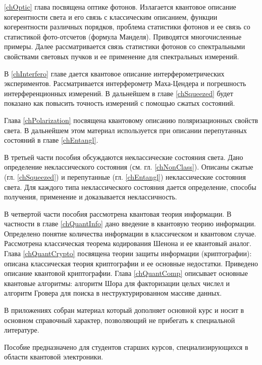 \ref{chOptic} глава посвящена оптике фотонов. Излагается квантовое описание
когерентности света и его связь с классическим описанием, функции
когерентности различных порядков, проблема статистики фотонов и ее
связь со статистикой фото-отсчетов (формула Манделя). Приводятся
многочисленные примеры. Далее рассматривается связь статистики фотонов
со спектральными свойствами световых пучков и ее применение для
спектральных измерений.

В \ref{chInterfero} главе дается квантовое описание интерферометрических
экспериментов. Рассматривается интерферометр Маха-Цендера и
погрешность интерференционных измерений. В дальнейшем в главе
\ref{chSqueezed} будет показано как повысить точность измерений с
помощью сжатых состояний.

Глава \ref{chPolarization} посвящена квантовому описанию
поляризационных свойств света. В дальнейшем этом материал используется
при описании перепутанных состояний в главе \ref{chEntangl}.

В третьей части пособия обсуждаются неклассические
состояния света. Дано определение неклассического состояния
(см. гл. \ref{chNonClass}). Описаны 
сжатые (гл. \ref{chSqueezed}) и перепутанные (гл. \ref{chEntangl})
неклассические состояния света. Для каждого типа неклассического
состояния дается определение, способы получения, применение и доказывается
неклассичность.  

В четвертой части пособия рассмотрена квантовая теория информации. В
частности в главе \ref{chQuantInfo} дано введение в квантовую теорию
информации. Определено понятие количества 
информации в классическом и квантовом случае. Рассмотрена классическая
теорема кодирования Шенона и ее квантовый аналог. Глава
\ref{chQuantCrypto} посвящена 
теории защиты информации (криптографии): описана классическая
теория криптографии и ее основные недостатки. Приведено описание
квантовой криптографии. Глава \ref{chQuantComp} описывает основные квантовые
алгоритмы: алгоритм Шора для факторизации целых числел и алгоритм
Гровера для поиска в неструктурированном массиве данных.

В приложениях собран материал который дополняет основной курс и носит
в основном справочный характер, позволяющий не прибегать к специальной
литературе. 

Пособие предназначено для студентов старших курсов, специализирующихся
в области квантовой электроники.  
